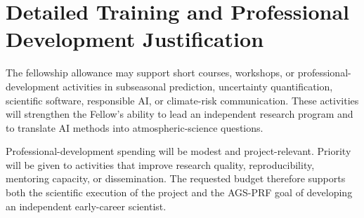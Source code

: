 \documentclass[11pt,letterpaper]{article}
\begin{document}
\newpage
\section*{Detailed Training and Professional Development Justification}
The fellowship allowance may support short courses, workshops, or professional-development activities in subseasonal prediction, uncertainty quantification, scientific software, responsible AI, or climate-risk communication. These activities will strengthen the Fellow's ability to lead an independent research program and to translate AI methods into atmospheric-science questions.

Professional-development spending will be modest and project-relevant. Priority will be given to activities that improve research quality, reproducibility, mentoring capacity, or dissemination. The requested budget therefore supports both the scientific execution of the project and the AGS-PRF goal of developing an independent early-career scientist.
\end{document}

